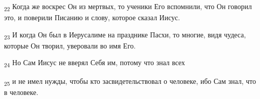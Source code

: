 \begin{tcolorbox}
\textsubscript{22} Когда же воскрес Он из мертвых, то ученики Его вспомнили, что Он говорил это, и поверили Писанию и слову, которое сказал Иисус.
\end{tcolorbox}
\begin{tcolorbox}
\textsubscript{23} И когда Он был в Иерусалиме на празднике Пасхи, то многие, видя чудеса, которые Он творил, уверовали во имя Его.
\end{tcolorbox}
\begin{tcolorbox}
\textsubscript{24} Но Сам Иисус не вверял Себя им, потому что знал всех
\end{tcolorbox}
\begin{tcolorbox}
\textsubscript{25} и не имел нужды, чтобы кто засвидетельствовал о человеке, ибо Сам знал, что в человеке.
\end{tcolorbox}
